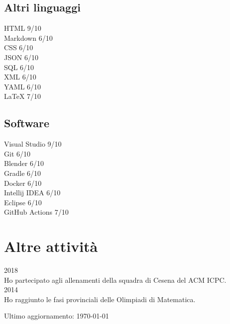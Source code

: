 \documentclass{article}
\newcommand{\years}[1]{{\large #1}\\}
\newcommand{\skill}[2]{#1 #2/10}
\begin{document}
	\subsection*{Altri linguaggi}
	\skill{HTML}{9}\\
	\skill{Markdown}{6}\\
	\skill{CSS}{6}\\
	\skill{JSON}{6}\\
	\skill{SQL}{6}\\
	\skill{XML}{6}\\
	\skill{YAML}{6}\\
	\skill{\LaTeX}{7}
	
	\subsection*{Software}
	\skill{Visual Studio}{9}\\
	\skill{Git}{6}\\
	\skill{Blender}{6}\\
	\skill{Gradle}{6}\\
	\skill{Docker}{6}\\
	\skill{Intellij IDEA}{6}\\
	\skill{Eclipse}{6}\\
	\skill{GitHub Actions}{7}
	
	\section*{Altre attività}
	\years{2018} Ho partecipato agli allenamenti della squadra di Cesena del ACM ICPC.\\
	
	\years{2014} Ho raggiunto le fasi provinciali delle Olimpiadi di Matematica.
	
	\vfill
	\begin{center}
		\scriptsize
		Ultimo aggiornamento: \today
	\end{center}
	
\end{document}
